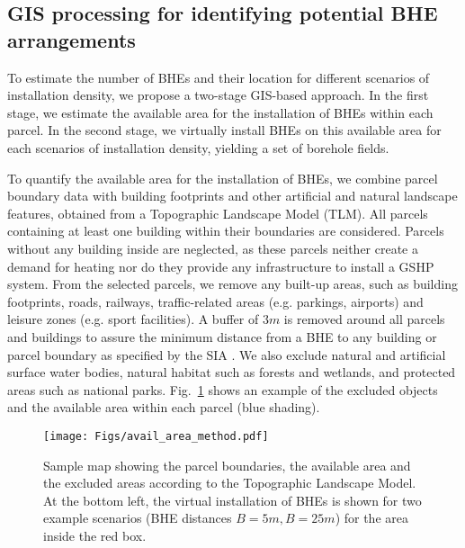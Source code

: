 \subsection{GIS processing for identifying potential BHE arrangements}
\label{GIS}

To estimate the number of BHEs and their location for different scenarios of installation density, we propose a two-stage GIS-based approach. 
In the first stage, we estimate the available area for the installation of BHEs within each parcel. 
In the second stage, we virtually install BHEs on this available area for each scenarios of installation density, yielding a set of borehole fields. 

To quantify the available area for the installation of BHEs, we combine parcel boundary data with building footprints and other artificial and natural landscape features, obtained from a Topographic Landscape Model (TLM). 
All parcels containing at least one building within their boundaries are considered. 
Parcels without any building inside are neglected, as these parcels neither create a demand for heating nor do they provide any infrastructure to install a GSHP system. 
From the selected parcels, we remove any built-up areas, such as building footprints, roads, railways, traffic-related areas (e.g. parkings, airports) and leisure zones (e.g. sport facilities).
A buffer of $3m$ is removed around all parcels and buildings to assure the minimum distance from a BHE to any building or parcel boundary as specified by the SIA \cite{sia_sondes_2010}.
We also exclude natural and artificial surface water bodies, natural habitat such as forests and wetlands, and protected areas such as national parks.
Fig.~\ref{fig:avail_area_method} shows an example of the excluded objects and the available area within each parcel (blue shading).

\begin{figure}[tb]
    \centering
    \texttt{[image: Figs/avail\_area\_method.pdf]}
    \caption{Sample map showing the parcel boundaries, the available area and the excluded areas according to the Topographic Landscape Model. At the bottom left, the virtual installation of BHEs is shown for two example scenarios (BHE distances $B = 5m, B=25m$) for the area inside the red box.}
    \label{fig:avail_area_method}
\end{figure}

